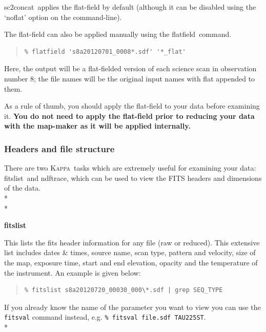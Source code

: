 \documentclass[twoside,11pt]{article}
\newcommand{\xref}[3]{#1}
\newcommand{\xlabel}[1]{}
\renewcommand{\_}{\texttt{\symbol{95}}}
\newenvironment{myquote}{\begin{quote}\begin{small}}{\end{small}\end{quote}}
\newcommand{\Kappa}{\xref{\textsc{Kappa}}{sun95}{}}
\newcommand{\task}[1]{\textsf{#1}}
\newcommand{\concat}{\xref{\task{sc2concat}}{sun258}{SC2CONCAT}}
\newcommand{\flatfield}{\xref{\task{flatfield}}{sun258}{FLATFIELD}}
\newcommand{\fitslist}{\xref{\task{fitslist}}{sun95}{FITSLIST}}
\newcommand{\ndftrace}{\xref{\task{ndftrace}}{sun95}{NDFTRACE}}
\begin{document}
\concat\ applies the flat-field by default (although it can be disabled using the `noflat' option on the command-line). 

The flat-field can also be applied manually using the \flatfield\ command.

\begin{myquote}
\begin{verbatim}
% flatfield 's8a20120701_0008*.sdf' '*_flat'
\end{verbatim}
\end{myquote}
Here, the output will be a flat-fielded version of each science scan in observation number 8; the file names will be the original input names with \_flat appended to them.

As a rule of thumb, you should apply the flat-field to your data before examining it. \textbf{You do not need to apply the flat-field prior to reducing your data with the map-maker as it will be applied internally.}



\subsubsection{\xlabel{header}Headers and file structure}
There are two \Kappa\ tasks which are extremely useful for examining your data: \fitslist\ and \ndftrace, which can be used to view the FITS headers and dimensions of the data.
\\*\\*
\begin{minipage}[t]{0.12\linewidth}
\textbf{fitslist}
\end{minipage}
\begin{minipage}[t]{0.85\linewidth}This lists the fits header information for any file (raw or reduced). This extensive list includes dates \& times, source name, scan type, pattern and velocity, size of the map, exposure time, start and end elevation, opacity and the temperature of the instrument. An example is given below:
\begin{myquote}
\begin{verbatim}
% fitslist s8a20120720_00030_000\*.sdf | grep SEQ_TYPE
\end{verbatim}
\end{myquote}
If you already know the name of the parameter you want to view you can use the \texttt{fitsval} command instead, e.g.  \texttt{\% fitsval file.sdf TAU225ST}.\\*
\end{minipage}
\end{document}
